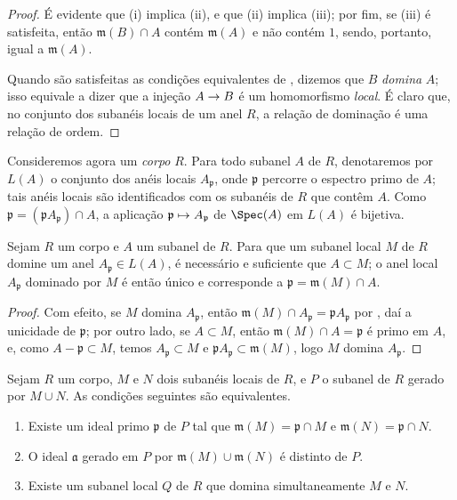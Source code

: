 \documentclass[oneside]{amsart}
\makeatletter
\newcommand{\ega@arrow}[2]{\mathchoice{#1}{#2}{#2}{#2}}
\let\ega@shortmapsto\mapsto
\renewcommand{\to}{\ega@arrow{\longrightarrow}{\rightarrow}}
\renewcommand{\mapsto}{\ega@arrow{\longmapsto}{\ega@shortmapsto}}
\newcommand{\oldpage}[2][]{{\marginnote{\normalfont\textbf{#1}~|~#2}}\ignorespaces}
\let\EGAOriginalLabel\label
\renewcommand{\label}[1]{\phantomsection\EGAOriginalLabel{#1}}
\makeatother
\begin{document}
\begin{proof}
É evidente que (i) implica (ii), e que (ii) implica (iii);
por fim, se (iii) é satisfeita, então $\mathfrak{m}(B)\cap A$ contém $\mathfrak{m}(A)$ e não contém $1$, sendo, portanto, igual a $\mathfrak{m}(A)$.

Quando são satisfeitas as condições equivalentes de , dizemos que $B$ \emph{domina} $A$;
isso equivale a dizer que a injeção $A\to B$ é um homomorfismo \emph{local}.
É claro que, no conjunto dos subanéis locais de um anel $R$, a relação de dominação é uma relação de ordem.
\end{proof}

\begin{env}[8.1.2]
\label{I.8.1.2}
Consideremos agora um \emph{corpo} $R$.
Para todo subanel $A$ de $R$, denotaremos por $L(A)$ o conjunto dos anéis locais $A_\mathfrak{p}$, onde $\mathfrak{p}$ percorre o espectro primo de $A$;
tais anéis locais são identificados com os subanéis de $R$ que contêm $A$.
Como $\mathfrak{p}=(\mathfrak{p}A_\mathfrak{p})\cap A$, a aplicação $\mathfrak{p}\mapsto A_\mathfrak{p}$ de $\Spec(A)$ em $L(A)$ é bijetiva.
\end{env}

\begin{lemma}[8.1.3]
\label{I.8.1.3}
Sejam $R$ um corpo e $A$ um subanel de $R$.
Para que um subanel local $M$ de $R$ domine um anel $A_\mathfrak{p}\in L(A)$, é necessário e suficiente que $A\subset M$;
o anel local $A_\mathfrak{p}$ dominado por $M$ é então único e corresponde a $\mathfrak{p}=\mathfrak{m}(M)\cap A$.
\end{lemma}

\begin{proof}
Com efeito, se $M$ domina $A_\mathfrak{p}$, então $\mathfrak{m}(M)\cap A_\mathfrak{p}=\mathfrak{p}A_\mathfrak{p}$ por , daí a unicidade de $\mathfrak{p}$;
por outro lado, se $A\subset M$, então $\mathfrak{m}(M)\cap A=\mathfrak{p}$ é primo em $A$, e, como $A-\mathfrak{p}\subset M$, temos $A_\mathfrak{p}\subset M$ e $\mathfrak{p}A_\mathfrak{p}\subset\mathfrak{m}(M)$, logo $M$ domina $A_\mathfrak{p}$.
\end{proof}

\oldpage[I]{165}
\begin{lemma}[8.1.4]
\label{I.8.1.4}
Sejam $R$ um corpo, $M$ e $N$ dois subanéis locais de $R$, e $P$ o subanel de $R$ gerado por $M\cup N$.
As condições seguintes são equivalentes.
\begin{enumerate}
  \item[{\rm(i)}] Existe um ideal primo $\mathfrak{p}$ de $P$ tal que $\mathfrak{m}(M)=\mathfrak{p}\cap M$ e $\mathfrak{m}(N)=\mathfrak{p}\cap N$.
  \item[{\rm(ii)}] O ideal $\mathfrak{a}$ gerado em $P$ por $\mathfrak{m}(M)\cup\mathfrak{m}(N)$ é distinto de $P$.
  \item[{\rm(iii)}] Existe um subanel local $Q$ de $R$ que domina simultaneamente $M$ e $N$.
\end{enumerate}
\end{lemma}
\end{document}

